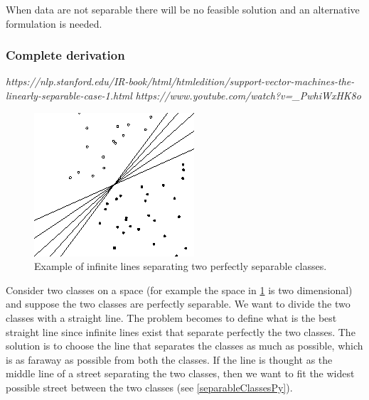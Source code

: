 \documentclass[12pt, letterpaper]{article}
\theoremstyle{definition}
\begin{document}
When data are not separable there will be no feasible solution and an alternative formulation is needed.

\subsubsection{Complete derivation}
\textit{https://nlp.stanford.edu/IR-book/html/htmledition/support-vector-machines-the-linearly-separable-case-1.html}
\textit{https://www.youtube.com/watch?v=\_PwhiWxHK8o}

\begin{figure}
\centering
\includegraphics[scale=0.6]{img/separableClasses}
\caption{Example of infinite lines separating two perfectly separable classes.}
\label{separableClasses}
\end{figure}

Consider two classes on a space (for example the space in \ref{separableClasses} is two dimensional) and suppose the two classes are perfectly separable. We want to divide the two classes with a straight line. The problem becomes to define what is the best straight line since infinite lines exist that separate  perfectly the two classes. The solution is to choose the line that separates the classes as much as possible, which is as faraway as possible from both the classes. If the line is thought as the middle line of a street separating the two classes, then we want to fit the widest possible street between the two classes (see \ref{separableClassesPy}).
\end{document}
